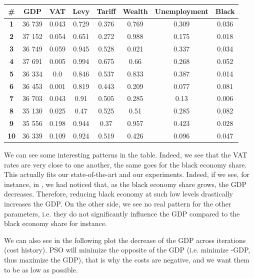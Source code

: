             \begin{table}[H]
            \centering
            \begin{tabular}{|c|c|c|c|c|c|c|c|}
                \hline
                \textbf{\#} & \textbf{GDP}  & \textbf{VAT} & \textbf{Levy} & \textbf{Tariff} & \textbf{Wealth} & \textbf{Unemployment} & \textbf{Black} \\ \hline
                \textbf{1} & 36 739 & 0.043 & 0.729 & 0.376 & 0.769 & 0.309 & 0.036 \\ \hline
                \textbf{2} & 37 152 & 0.054 & 0.651 & 0.272 & 0.988 & 0.175 & 0.018 \\ \hline
                \textbf{3} & 36 749 & 0.059 & 0.945 & 0.528 & 0.021 & 0.337 & 0.034 \\ \hline
                \textbf{4} & 37 691 & 0.005 & 0.994 & 0.675 & 0.66 & 0.268 & 0.052 \\ \hline
                \textbf{5} & 36 334 & 0.0 & 0.846 & 0.537 & 0.833 & 0.387 & 0.014 \\ \hline
                \textbf{6} & 36 453 & 0.001 & 0.819 & 0.443 & 0.209 & 0.077 & 0.081 \\ \hline
                \textbf{7} & 36 703 & 0.043 & 0.91 & 0.505 & 0.285 & 0.13 & 0.006 \\ \hline
                \textbf{8} & 35 130 & 0.025 & 0.47 & 0.525 & 0.51 & 0.285 & 0.082 \\ \hline
                \textbf{9} & 35 556 & 0.198 & 0.944 & 0.37 & 0.957 & 0.423 & 0.028 \\ \hline
                \textbf{10} & 36 339 & 0.109 & 0.924 & 0.519 & 0.426 & 0.096 & 0.047 \\ \hline
            \end{tabular}
            \end{table}

            We can see some interesting patterns in the table. Indeed, we see that the VAT rates are very close to one another, the same goes for the black economy share. This actually fits our state-of-the-art and our experiments. Indeed, if we see, for instance, in , we had noticed that, as the black economy share grows, the GDP decreases. Therefore, reducing black economy at such low levels drastically increases the GDP.
            On the other side, we see no real pattern for the other parameters, i.e. they do not significantly influence the GDP compared to the black economy share for instance.

            We can also see in the following plot the decrease of the GDP across iterations (cost history). PSO will minimize the opposite of the GDP (i.e. minimize -GDP, thus maximize the GDP), that is why the costs are negative, and we want them to be as low as possible.


